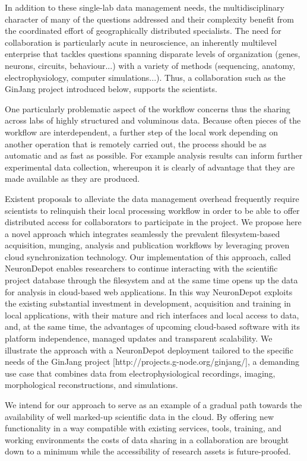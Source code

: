 \documentclass{frontiersSCNS} %
\begin{document}
In addition to these single-lab data management needs, the multidisciplinary
character of many of the questions addressed and their complexity benefit from
the coordinated effort of geographically distributed specialists. The need for
collaboration is particularly acute in neuroscience, an inherently multilevel
enterprise that tackles questions spanning disparate levels of organization
(genes, neurons, circuits, behaviour...) with a variety of methods (sequencing,
anatomy, electrophysiology, computer simulations...). Thus, a collaboration
such as the GinJang project introduced below, supports the scientists.

One particularly problematic aspect of the workflow concerns thus the sharing
across labs of highly structured and voluminous data. Because often pieces of
the workflow are interdependent, a further step of the local work depending on
another operation that is remotely carried out, the process should be as
automatic and as fast as possible. For example analysis results can inform
further experimental data collection, whereupon it is clearly of advantage that
they are made available as they are produced.

Existent proposals to alleviate the data management overhead frequently require
scientists to relinquish their local processing workflow in order to be able to
offer distributed access for collaborators to participate in the project. We
propose here a novel approach which integrates seamlessly the prevalent
filesystem-based acquisition, munging, analysis and publication workflows by
leveraging proven cloud synchronization technology. Our implementation of this
approach, called NeuronDepot enables researchers to continue interacting with
the scientific project database through the filesystem and at the same time
opens up the data for analysis in cloud-based web applications. In this way
NeuronDepot exploits the existing substantial investment in development,
acquisition and training in local applications, with their mature and rich
interfaces and local access to data, and, at the same time, the advantages of
upcoming cloud-based software with its platform independence, managed updates
and transparent scalability. We illustrate the approach with a NeuronDepot
deployment tailored to the specific needs of the GinJang project
[http://projects.g-node.org/ginjang/], a demanding use case that combines data
from electrophysiological recordings, imaging, morphological reconstructions,
and simulations.

We intend for our approach to serve as an example of a gradual path towards the
availability of well marked-up scientific data in the cloud. By offering new
functionality in a way compatible with existing services, tools, training, and
working environments the costs of data sharing in a collaboration are brought
down to a minimum while the accessibility of research assets is future-proofed.
\end{document}
